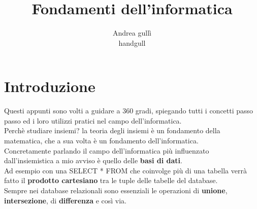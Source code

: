 \documentclass[oneside,12pt]{book}
\title{Fondamenti dell'informatica}
\author{Andrea gullì \\ handgull}
\begin{document}
\maketitle

\tableofcontents

\chapter*{Introduzione}

Questi appunti sono volti a guidare a 360 gradi,
spiegando tutti i concetti passo passo ed i loro utilizzi pratici nel campo dell'informatica. \\
Perchè studiare insiemi? la teoria degli insiemi è un fondamento della matematica,
che a sua volta è un fondamento dell'informatica. \\
Concretamente parlando il campo dell'informatica più influenzato dall'insiemistica
a mio avviso è quello delle \textbf{basi di dati}. \\
Ad esempio con una SELECT * FROM che coinvolge più di una tabella verrà fatto il \textbf{prodotto cartesiano} tra le tuple delle tabelle del database. \\
Sempre nei database relazionali sono essenziali le operazioni di \textbf{unione}, \textbf{intersezione}, di \textbf{differenza} e così via.


\end{document}
